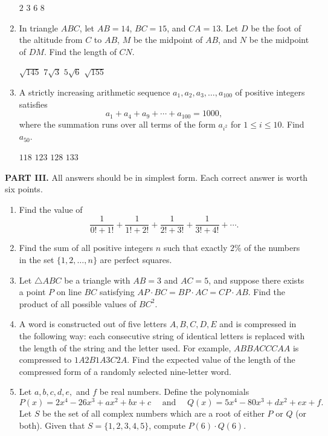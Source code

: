 \documentclass[11pt,paper=letter]{scrartcl}
\begin{document}
\begin{enumerate}
  \fourch
  {$2$}
  {$3$}
  {$6$}
  {$8$}

  \item In triangle $ABC$, let ${AB}=14$, ${BC}=15$, and ${CA}=13$. Let $D$ be the foot of the altitude from $C$ to ${AB}$, $M$ be the midpoint of ${AB}$, and $N$ be the midpoint of ${DM}$. Find the length of ${CN}$.

  \fourch
  {$\sqrt{145}$}
  {$7\sqrt{3}$}
  {$5\sqrt{6}$}
  {$\sqrt{155}$}

  \item A strictly increasing arithmetic sequence $a_1, a_2, a_3, \ldots, a_{100}$ of positive integers satisfies \[a_1+a_4+a_9+\cdots+a_{100}=\text{1000},\] where the summation runs over all terms of the form $a_{i^2}$ for $1\leq i\leq 10$. Find $a_{50}$.

  \fourch
  {$118$}
  {$123$}
  {$128$}
  {$133$}
\end{enumerate}

\newpage
\noindent\textbf{PART III.} All answers should be in simplest form. Each correct answer is worth six points.

\begin{enumerate}
  \item Find the value of $$\frac{1}{0! + 1!} + \frac{1}{1! + 2!} + \frac{1}{2! + 3!} + \frac{1}{3! + 4!} + \cdots .$$
  \item Find the sum of all positive integers $n$ such that exactly $2\%$ of the numbers in the set $\{1, 2, \ldots, n\}$ are perfect squares.
  \item Let $\triangle ABC$ be a triangle with $AB = 3$ and $AC = 5$, and suppose there exists a point $P$ on line $BC$ satisfying $AP \cdot BC = BP \cdot AC = CP \cdot AB.$ Find the product of all possible values of $BC^2$.
  \item A word is constructed out of five letters $A, B, C, D, E$ and is compressed in the following way: each consecutive string of identical letters is replaced with the length of the string and the letter used. For example, $ABBACCCAA$ is compressed to $1A2B1A3C2A$. Find the expected value of the length of the compressed form of a randomly selected nine-letter word.
  \item Let $a, b, c, d, e,$ and $f$ be real numbers. Define the polynomials \[
 P(x) = 2x^4 - 26x^3 + ax^2 + bx + c \quad\text{ and }\quad Q(x) = 5x^4 - 80x^3 + dx^2 + ex + f. \] Let $S$ be the set of all complex numbers which are a root of either $P$ or $Q$ (or both). Given that $S = \{1,2,3,4,5\}$, compute $P(6) \cdot Q(6).$
\end{enumerate}
\end{document}
